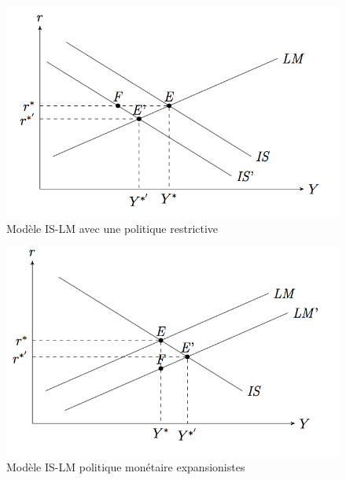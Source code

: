 \begin{figure}[h]
		\begin{center}
			\includegraphics[scale=0.5]{./img/im5}
		\end{center}
		\caption{Modèle IS-LM avec une politique restrictive}
	   \label{fig:modele_islm_rest}
\end{figure}	
\begin{figure}[h]
		\begin{center}
			\includegraphics[scale=0.5]{./img/im6}
		\end{center}
		\caption{Modèle IS-LM politique monétaire expansionistes}
	   \label{fig:modele_islm_exp}
\end{figure}

